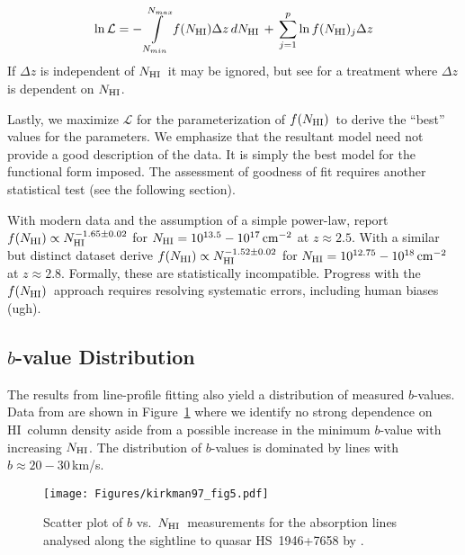 \documentclass[graybox]{svmult}
\newcommand{\HI}{H{\sc I}}
\def\smm{\sum\limits}
\def\intl{\int\limits}
\newcommand{\mnhi}{N_{\rm HI}}
\newcommand{\nhi}{$\mnhi$}
\def\cm#1{\, {\rm cm^{#1}}}
\def\mfnhi{f(\mnhi)}
\def\fnhi{$\mfnhi$}
\begin{document}
\begin{equation}
\ln \mathcal{L} = - \intl_{N_{min}}^{N_{max}} f(\mnhi) \Delta z \, d\mnhi 
\, + \, \smm_{j=1}^p \ln f(\mnhi)_j \Delta z
\end{equation}
If $\Delta z$ is independent of \nhi\ it may be ignored,
but see \cite{ctp+10} for a treatment where
$\Delta z$ is dependent on \nhi.

Lastly, we maximize $\mathcal{L}$ for the parameterization of \fnhi\
to derive the ``best'' values for the parameters.
We emphasize that the resultant model need not 
provide a good description of the data.  It is simply the 
best model for the functional form imposed.
The assessment of goodness of fit requires another statistical
test (see the following section).

With modern data and the assumption of a simple
power-law, \cite{rudie13} report
$\mfnhi \propto \mnhi^{-1.65 \pm 0.02}$ for
$\mnhi = 10^{13.5} - 10^{17} \cm{-2}$ at $z \approx 2.5$.
With a similar but distinct dataset 
\cite{kim13} derive
$\mfnhi \propto \mnhi^{-1.52 \pm 0.02}$
for $\mnhi = 10^{12.75} - 10^{18} \cm{-2}$
at $z \approx 2.8$.
Formally, these are statistically incompatible.
Progress with the \fnhi\ approach
requires resolving systematic errors, including
human biases (ugh).

\subsection{$b$-value Distribution}

The results from  line-profile fitting also yield 
a distribution of measured $b$-values.
Data from \cite{kt97} are shown in 
Figure~\ref{fig:kt97_bN_scatter} where we identify
no strong dependence on \HI\ column density aside from
a possible increase in the minimum $b$-value with increasing \nhi.
The distribution of $b$-values is dominated by lines with
$b \approx 20-30$\,km/s.

%
\begin{figure}[b]
\sidecaption
\texttt{[image: Figures/kirkman97\_fig5.pdf]}
%
%
\caption{Scatter plot of $b$ vs.\ \nhi\ measurements for
the absorption lines analysed along the sightline
to quasar HS~1946+7658 by \cite{kt97}.
}
\label{fig:kt97_bN_scatter}       %
\end{figure}
\end{document}
